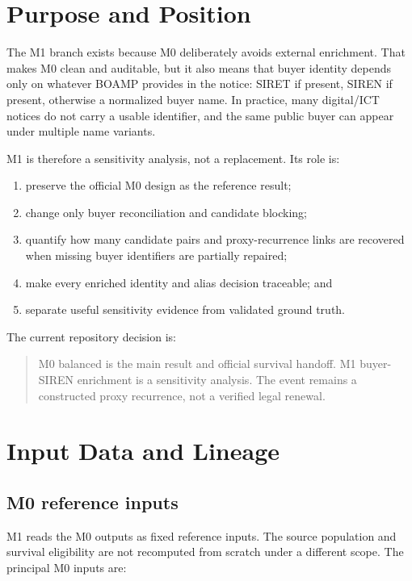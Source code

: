 \documentclass[11pt]{article}
\begin{document}
\tableofcontents

\section{Purpose and Position}
\label{sec:purpose}

The M1 branch exists because M0 deliberately avoids external enrichment.
That makes M0 clean and auditable, but it also means that buyer identity
depends only on whatever BOAMP provides in the notice: SIRET if present,
SIREN if present, otherwise a normalized buyer name. In practice, many
digital/ICT notices do not carry a usable identifier, and the same public
buyer can appear under multiple name variants.

M1 is therefore a sensitivity analysis, not a replacement. Its role is:

\begin{enumerate}
  \item preserve the official M0 design as the reference result;
  \item change only buyer reconciliation and candidate blocking;
  \item quantify how many candidate pairs and proxy-recurrence links are
        recovered when missing buyer identifiers are partially repaired;
  \item make every enriched identity and alias decision traceable; and
  \item separate useful sensitivity evidence from validated ground truth.
\end{enumerate}

The current repository decision is:

\begin{quote}
M0 balanced is the main result and official survival handoff. M1
buyer-SIREN enrichment is a sensitivity analysis. The event remains a
constructed proxy recurrence, not a verified legal renewal.
\end{quote}

\section{Input Data and Lineage}
\label{sec:lineage}

\subsection{M0 reference inputs}

M1 reads the M0 outputs as fixed reference inputs. The source population
and survival eligibility are not recomputed from scratch under a different
scope. The principal M0 inputs are:
\end{document}
